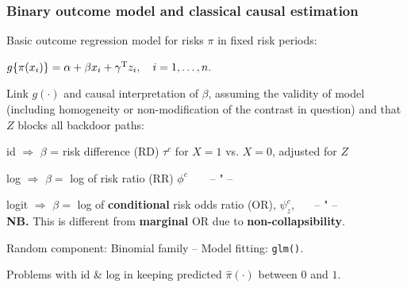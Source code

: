 \documentclass[12pt,dvipsnames,t,aspectratio=169, handout%
]{beamer}
\begin{document}
\begin{frame}

\frametitle{\large Binary outcome model and classical causal estimation}

\bi
\item
Basic outcome regression model for risks $\pi$ in fixed risk periods: %
\begin{center}
$ g\{\pi(x_i)\} = \alpha + \beta x_i + \gamma^{\small\text{T}} z_i, \quad i = 1, \dots, n.$
\end{center}
\pause
\medskip
\item
Link $g(\cdot)$ and causal interpretation of $\beta$, assuming the
validity of model (including homogeneity or non-modification of the contrast in question)
and that $Z$ blocks all backdoor paths:   
\bi
{\normalsize 
\item[--]  id $\Rightarrow$ $\beta$ = 
risk difference (RD) $\tau^c$ for $X=1$ vs. $X=0$, adjusted for $Z$
\item[--] log $\Rightarrow$ $\beta =$ 
log of risk ratio (RR) $\phi^c$\ \ \ \ -- " --
\item[--] logit $\Rightarrow$ $\beta =$ 
log of \textbf{conditional} risk odds ratio (OR),  $\psi_z^c$, \ \ \ -- " -- \\
{\bf NB.} This is different from \textbf{marginal} OR due to \textbf{non-collapsibility}.
}
\ei
\pause
\item
Random component: Binomial family -- Model fitting: \texttt{glm()}.
\item
Problems with id \& log in keeping predicted $\widehat\pi(\cdot)$ between $0$ and $1$. 
\ei
\end{frame}
\end{document}
